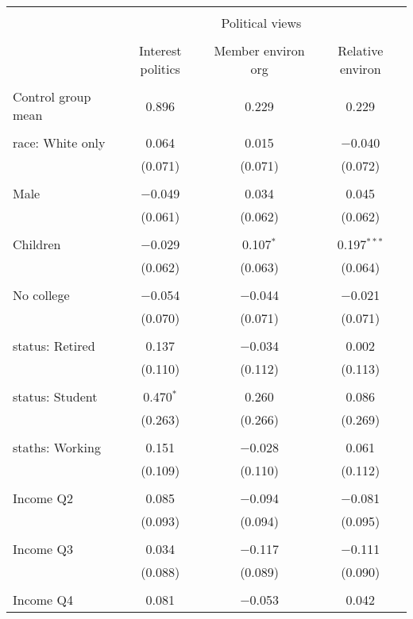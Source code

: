
\begin{tabular}{@{\extracolsep{5pt}}lccc} 
\\[-1.8ex]\hline 
\hline \\[-1.8ex] 
 & \multicolumn{3}{c}{Political views} \\ 
\cline{2-4} 
\\[-1.8ex] & Interest politics & Member environ org & Relative environ \\ 
\hline \\[-1.8ex] 
 Control group mean & 0.896 & 0.229 & 0.229  \\ \hline \\[-1.8ex] race: White only & 0.064 & 0.015 & $-$0.040 \\ 
  & (0.071) & (0.071) & (0.072) \\ 
  & & & \\ 
 Male & $-$0.049 & 0.034 & 0.045 \\ 
  & (0.061) & (0.062) & (0.062) \\ 
  & & & \\ 
 Children & $-$0.029 & 0.107$^{*}$ & 0.197$^{***}$ \\ 
  & (0.062) & (0.063) & (0.064) \\ 
  & & & \\ 
 No college & $-$0.054 & $-$0.044 & $-$0.021 \\ 
  & (0.070) & (0.071) & (0.071) \\ 
  & & & \\ 
 status: Retired & 0.137 & $-$0.034 & 0.002 \\ 
  & (0.110) & (0.112) & (0.113) \\ 
  & & & \\ 
 status: Student & 0.470$^{*}$ & 0.260 & 0.086 \\ 
  & (0.263) & (0.266) & (0.269) \\ 
  & & & \\ 
 staths: Working & 0.151 & $-$0.028 & 0.061 \\ 
  & (0.109) & (0.110) & (0.112) \\ 
  & & & \\ 
 Income Q2 & 0.085 & $-$0.094 & $-$0.081 \\ 
  & (0.093) & (0.094) & (0.095) \\ 
  & & & \\ 
 Income Q3 & 0.034 & $-$0.117 & $-$0.111 \\ 
  & (0.088) & (0.089) & (0.090) \\ 
  & & & \\ 
 Income Q4 & 0.081 & $-$0.053 & 0.042 \\ 

\end{tabular}
